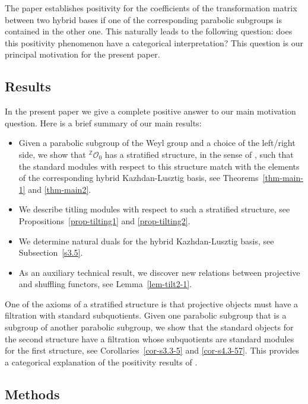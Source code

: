 \documentclass[a4paper]{amsart}
\begin{document}
The paper \cite{BMS} establishes positivity for the coefficients 
of the transformation matrix between two hybrid bases if one of
the corresponding parabolic subgroups is contained in the other one. 
This naturally leads to the following question: does this
positivity phenomenon have a categorical interpretation? This 
question is our principal motivation for the present paper.

\subsection{Results}\label{s0.3}

In the present paper we give a complete positive answer to our
main motivation question. Here is a brief summary of our
main results:
\begin{itemize}
\item Given a parabolic subgroup of the Weyl group and a choice of
the left/right side, we show that ${}^{\mathbb{Z}}\mathcal{O}_0$
has a stratified structure, in the sense of \cite{CPS,Fr}, such that
the standard modules with respect to this structure match with the 
elements of the corresponding hybrid Kazhdan-Lusztig basis,
see Theorems~\ref{thm-main-1} and \ref{thm-main2}. 
\item We describe titling modules with respect to such a stratified
structure, see Propositions~\ref{prop-tilting1} and \ref{prop-tilting2}.
\item We determine natural duals for the hybrid Kazhdan-Lusztig basis,
see Subsection~\ref{s3.5}.
\item As an auxiliary technical result, we discover new relations between 
projective and shuffling functors, see Lemma~\ref{lem-tilt2-1}.
\end{itemize}

One of the axioms of a stratified structure is that projective objects
must have a filtration with standard subquotients. Given one parabolic
subgroup that is a subgroup of another parabolic subgroup, we show
that the standard objects for the second structure have a filtration
whose subquotients are standard modules for the first structure,
see Corollaries~\ref{cor-s3.3-5} and \ref{cor-s4.3-57}. This provides
a categorical explanation of the positivity results of \cite{GH07,BMS}.

\subsection{Methods}\label{s0.4}
\end{document}

